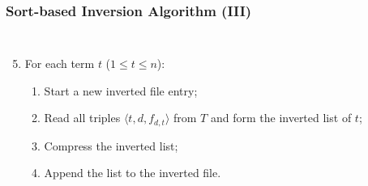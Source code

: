 \documentclass[svgnames]{beamer}
\begin{document}
\begin{frame}
    \frametitle{Sort-based Inversion Algorithm (III)}
    
    \begin{columns}

        \begin{enumerate}
            \setcounter{enumi}{4}
        \item For each term $t$ ($1 \leq t \leq n$):
            \begin{enumerate}
            \item Start a new inverted file entry;
            \item Read all triples $\langle t, d, f_{d,t} \rangle$ from $T$ and form
                the inverted list of $t$;
            \item Compress the inverted list;
            \item Append the list to the inverted file.
            \end{enumerate}
        \end{enumerate}


        \begin{block}{}
            \centering \small


\end{block}
\end{columns}
\end{frame}
\end{document}
